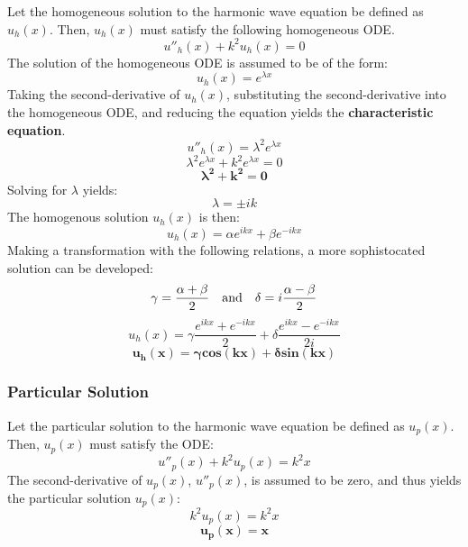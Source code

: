 \documentclass[10pt]{article}		%
\numberwithin{equation}{section}
\begin{document}
Let the homogeneous solution to the harmonic wave equation be defined as $u_h(x)$. Then, $u_h(x)$ must satisfy the following homogeneous ODE.
\begin{equation}
u''_h(x) + k^2u_h(x) = 0
\end{equation}
The solution of the homogeneous ODE is assumed to be of the form: 
\begin{equation}
u_h(x) = e^{\lambda x}
\end{equation}
Taking the second-derivative of $u_h(x)$, substituting the second-derivative into the homogeneous ODE, and reducing the equation yields the \textbf{characteristic equation}.
\begin{equation}
u''_h(x) = \lambda^2 e^{\lambda x}
\end{equation}
\begin{equation}
\lambda^2 e^{\lambda x} + k^2e^{\lambda x} = 0
\end{equation}
\begin{equation}
\mathbf{\lambda^2 + k^2 = 0}
\end{equation}
Solving for $\lambda$ yields:
\begin{equation}
\lambda = \pm ik
\end{equation}
The homogenous solution $u_h(x)$ is then:
\begin{equation}
u_h(x) = \alpha e^{ikx} + \beta e^{-ikx}
\end{equation}
Making a transformation with the following relations, a more sophistocated solution can be developed:
\begin{equation}
\gamma = \frac{\alpha+\beta}{2} \quad \textnormal{and} \quad \delta = i\frac{\alpha-\beta}{2}
\end{equation}
\begin{equation}
u_h(x) = \gamma \frac{e^{ikx}+e^{-ikx}}{2} + \delta \frac{e^{ikx}-e^{-ikx}}{2i}
\end{equation}
\begin{equation}
\mathbf{u_h(x) = \gamma cos(kx) + \delta sin(kx)}
\end{equation}

\subsubsection{Particular Solution}

Let the particular solution to the harmonic wave equation be defined as $u_p(x)$. Then, $u_p(x)$ must satisfy the ODE:
\begin{equation}
u''_p(x) + k^2u_p(x) = k^2x
\end{equation}
The second-derivative of $u_p(x)$, $u''_p(x)$, is assumed to be zero, and thus yields the particular solution $u_p(x)$:
\begin{equation}
k^2u_p(x) = k^2x
\end{equation}
\begin{equation}
\mathbf{u_p(x) = x}
\end{equation}
\end{document}
